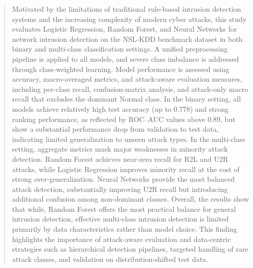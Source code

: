 \documentclass[oneside, master=eelt,masteroption=ec]{kulemt}
\begin{document}
\tableofcontents*

\begin{abstract}
  Motivated by the limitations of traditional rule-based intrusion detection systems and the increasing complexity of modern cyber attacks, 
  this study evaluates Logistic Regression, Random Forest, and Neural Networks for network intrusion detection on the NSL-KDD benchmark dataset in both binary and multi-class classification settings. 
  A unified preprocessing pipeline is applied to all models, and severe class imbalance is addressed through class-weighted learning. Model performance is assessed using accuracy, macro-averaged 
  metrics, and attack-aware evaluation measures, including per-class recall, confusion-matrix analysis, and attack-only macro recall that 
  excludes the dominant Normal class. In the binary setting, all models achieve relatively high test accuracy (up to 0.778) and strong ranking performance, 
  as reflected by ROC–AUC values above 0.89, but show a substantial performance drop from validation to test data, indicating limited generalization to unseen attack types. 
  In the multi-class setting, aggregate metrics mask major weaknesses in minority attack detection. Random Forest achieves near-zero recall for R2L and U2R attacks, 
  while Logistic Regression improves minority recall at the cost of strong over-generalization. Neural Networks provide the most balanced attack detection, 
  substantially improving U2R recall but introducing additional confusion among non-dominant classes. Overall, the results show that while, Random Forest offers the 
  most practical balance for general intrusion detection, effective multi-class intrusion detection is limited primarily by 
  data characteristics rather than model choice. This finding highlights the importance of attack-aware evaluation and data-centric strategies such as hierarchical detection pipelines, 
  targeted handling of rare attack classes, and validation on distribution-shifted test data.
\end{abstract}

\listoffiguresandtables

\mainmatter









\end{document}
